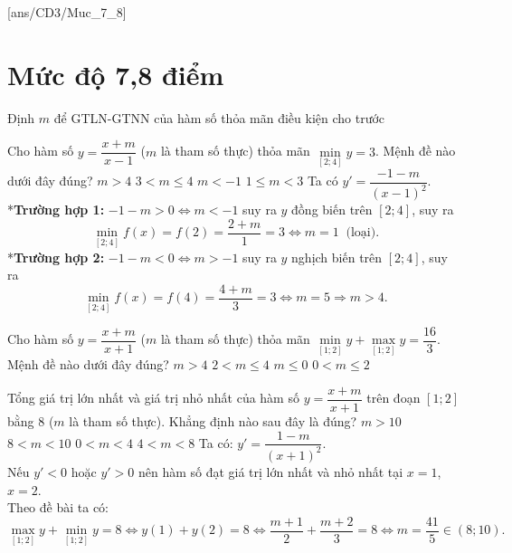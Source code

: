 [ans/CD3/Muc_7_8]
\section{Mức độ 7,8 điểm}
\setcounter{ex}{0}
\setcounter{dang}{0}
\begin{dang}
	{Định $m$ để GTLN-GTNN của hàm số thỏa mãn điều kiện cho trước}
\end{dang}
\begin{ex}%
	Cho hàm số $y=\dfrac{x+m}{x-1}$ ($m$ là tham số thực) thỏa mãn $\min\limits_{[2;4]} y=3$. Mệnh đề nào dưới đây đúng?
	\choice
	{\True $m>4$}
	{$3<m\leq4$}
	{$m<-1$}
	{$1\leq m<3$}
	\loigiai
	{Ta có $y'=\dfrac{-1-m}{\left(x-1\right)^2}$.\\
	*\textbf{Trường hợp 1:} $-1-m>0 \Leftrightarrow m<-1$ suy ra $y$ đồng biến trên $[2;4]$, suy ra $$\min\limits_{[2;4]} f(x)=f(2)=\dfrac{2+m}{1}=3  \Leftrightarrow m=1 \;\;\text{(loại)}.$$
	*\textbf{Trường hợp 2:} $-1-m<0 \Leftrightarrow m>-1$ suy ra $y$ nghịch biến trên $[2;4]$, suy ra $$\min\limits_{[2;4]} f(x)=f(4)=\dfrac{4+m}{3}=3  \Leftrightarrow m=5 \Rightarrow m > 4.$$
}
\end{ex}
\begin{ex}%
	Cho hàm số $ y=\dfrac{x+m}{x+1}$ ($m$ là tham số thực) thỏa mãn $\min\limits_{[1;2]} y+\max\limits_{[1;2]} y=\dfrac{16}{3}$. Mệnh đề nào dưới đây đúng?
	\choice
	{\True $m>4$}
	{$2<m\leq 4$}
	{$m\leq 0$}
	{$0<m\leq 2$}
\end{ex}
\begin{ex}%
	Tổng giá trị lớn nhất và giá trị nhỏ nhất của hàm số $y=\dfrac{x+m}{x+1}$ trên đoạn $[1;2]$ bằng 8 ($m$ là tham số thực). Khẳng định nào sau đây là đúng?
	\choice
	{$m>10$}
	{\True $8<m<10$}
	{$0<m<4$}
	{$4<m<8$}
\loigiai
{Ta có: $y'=\dfrac{1-m}{(x+1)^2}$.\\
Nếu $y'<0$ hoặc $y'>0$ nên hàm số đạt giá trị lớn nhất và nhỏ nhất tại $x=1$, $x=2$.\\ 
Theo đề bài ta có: $$\max\limits_{[1;2]} y+\min\limits_{[1;2]} y=8 \Leftrightarrow y(1)+y(2)=8 \Leftrightarrow \dfrac{m+1}{2}+\dfrac{m+2}{3}=8 \Leftrightarrow m=\dfrac{41}{5}\in (8;10).$$
}
\end{ex}
